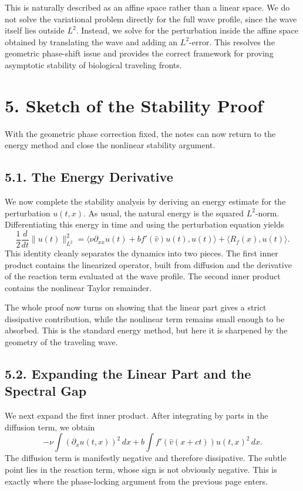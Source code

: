 \documentclass[11pt]{article}
\theoremstyle{definition}
\theoremstyle{remark}
\begin{document}
This is naturally described as an affine space rather than a linear space. We do not solve the variational problem directly for the full wave profile, since the wave itself lies outside \(L^2\). Instead, we solve for the perturbation inside the affine space obtained by translating the wave and adding an \(L^2\)-error. This resolves the geometric phase-shift issue and provides the correct framework for proving asymptotic stability of biological traveling fronts.

\section*{5. Sketch of the Stability Proof}
With the geometric phase correction fixed, the notes can now return to the energy method and close the nonlinear stability argument.

\subsection*{5.1. The Energy Derivative}
We now complete the stability analysis by deriving an energy estimate for the perturbation \(u(t,x)\). As usual, the natural energy is the squared \(L^2\)-norm. Differentiating this energy in time and using the perturbation equation yields
\[
\frac12\frac{d}{dt}\|u(t)\|_{L^2}^2
=\langle \nu\partial_{xx}u(t)+bf'(\widehat v)u(t),u(t)\rangle
+\langle R_f(x),u(t)\rangle.
\]
This identity cleanly separates the dynamics into two pieces. The first inner product contains the linearized operator, built from diffusion and the derivative of the reaction term evaluated at the wave profile. The second inner product contains the nonlinear Taylor remainder.

The whole proof now turns on showing that the linear part gives a strict dissipative contribution, while the nonlinear term remains small enough to be absorbed. This is the standard energy method, but here it is sharpened by the geometry of the traveling wave.

\subsection*{5.2. Expanding the Linear Part and the Spectral Gap}
We next expand the first inner product. After integrating by parts in the diffusion term, we obtain
\[
-\nu\int (\partial_x u(t,x))^2\,dx
+b\int f'(\widehat v(x+ct))u(t,x)^2\,dx.
\]
The diffusion term is manifestly negative and therefore dissipative. The subtle point lies in the reaction term, whose sign is not obviously negative. This is exactly where the phase-locking argument from the previous page enters.
\end{document}
